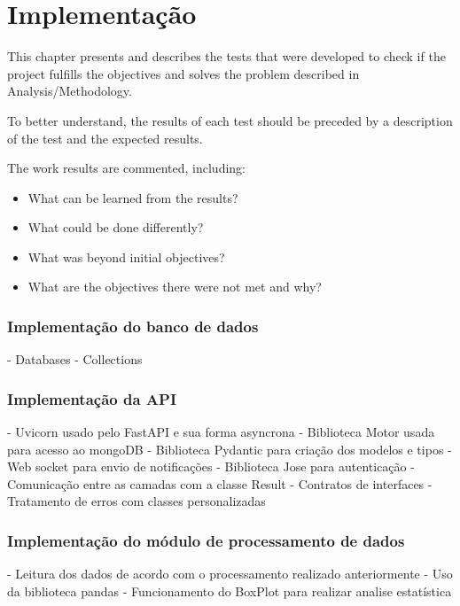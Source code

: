 \chapter{Implementação}\label{cap:test}

This chapter presents and describes the tests that were developed to check if the project fulfills the objectives and solves the problem described in Analysis/Methodology.

To better understand, the results of each test should be preceded by a description of the test and the expected results.

The work results are commented, including:

\begin{itemize}
	\item  What can be learned from the results?
	\item What could be done differently? 
	\item What was beyond initial objectives?
	\item What are the objectives there were not met and why?
\end{itemize}


\subsection[Implementação do banco de dados]{Implementação do banco de dados}
- Databases
- Collections

\subsection[Implementação da API]{Implementação da API}

- Uvicorn usado pelo FastAPI e sua forma asyncrona
- Biblioteca Motor usada para acesso ao mongoDB
- Biblioteca Pydantic para criação dos modelos e tipos
- Web socket para envio de notificações
- Biblioteca Jose para autenticação
- Comunicação entre as camadas com a classe Result
- Contratos de interfaces
- Tratamento de erros com classes personalizadas


\subsection[Implementação do módulo de processamento de dados]{Implementação do módulo de processamento de dados}
- Leitura dos dados de acordo com o processamento realizado anteriormente
- Uso da biblioteca pandas
- Funcionamento do BoxPlot para realizar analise estatística

